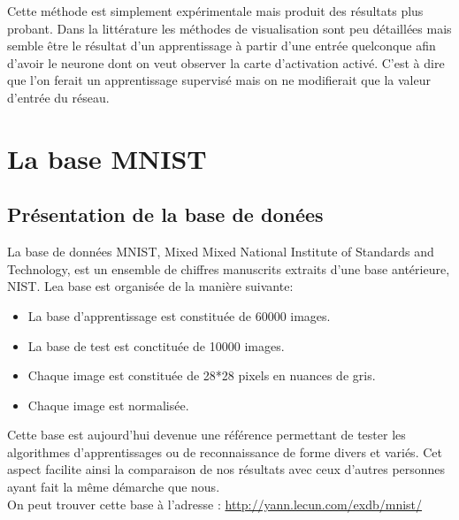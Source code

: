 \documentclass[a4paper,oneside]{report}
\begin{document}
Cette méthode est simplement expérimentale mais produit des résultats plus probant. Dans la littérature les méthodes de visualisation sont peu détaillées mais semble être le résultat d'un apprentissage à partir d'une entrée quelconque afin d'avoir le neurone dont on veut observer la carte d'activation activé. C'est à dire que l'on ferait un apprentissage supervisé mais on ne modifierait que la valeur d'entrée du réseau.




    \appendix

        \chapter{La base MNIST}

            \section{Présentation de la base de donées}

                La base de données MNIST, Mixed Mixed National Institute of Standards and Technology, 
est un ensemble de chiffres manuscrits extraits d'une base antérieure, NIST. Lea base 
est organisée de la manière 
suivante:

                \begin{itemize}
                    \item La base d'apprentissage est constituée de 60000 images.
                    \item La base de test est conctituée de 10000 images.
                    \item Chaque image est constituée de 28*28 pixels en nuances de gris.
                    \item Chaque image est normalisée.\\
                \end{itemize}

                Cette base est aujourd'hui devenue une référence permettant de tester les algorithmes 
d'apprentissages ou de reconnaissance de forme divers et variés. Cet aspect facilite 
ainsi la comparaison de nos 
résultats avec ceux d'autres personnes ayant fait la même démarche que nous.\\

                On peut trouver cette base à l'adresse : \url{http://yann.lecun.com/exdb/mnist/}
\end{document}

